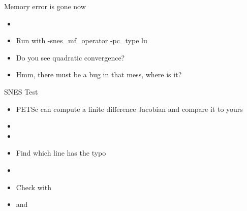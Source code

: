 

\begin{frame}{Memory error is gone now}
\begin{itemize}
  \item {}
  \item Run with {-snes\_mf\_operator -pc\_type lu}
  \item Do you see quadratic convergence?
  \item<2-> Hmm, there must be a bug in that mess, where is it?
  \end{itemize}
\end{frame}

\begin{frame}{SNES Test}
  \begin{itemize}
  \item PETSc can compute a finite difference Jacobian and compare it to yours
  \item {}
  \item {}
  \item Find which line has the typo
  \item {}
  \item Check with  
  \item and 
  \end{itemize}
\end{frame}


% 
